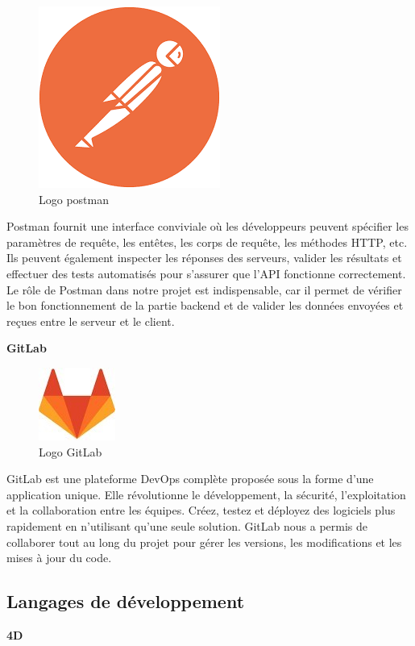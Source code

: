 \begin{figure}[htbp]
   \centering
   \includegraphics[scale=0.4]{Images/postman.png} 
   \caption{Logo postman\cite{Postman}}
   \label{fig:postman}
\end{figure}

Postman fournit une interface conviviale où les développeurs 
peuvent spécifier les paramètres de requête, les entêtes, 
les corps de requête, les méthodes HTTP, etc. Ils peuvent 
également inspecter les réponses des serveurs, valider les 
résultats et effectuer des tests automatisés pour s’assurer que 
l’API fonctionne correctement\cite{Postman}. Le rôle de Postman 
dans notre projet est indispensable, car il permet de vérifier 
le bon fonctionnement de la partie backend et de valider les 
données envoyées et reçues entre le serveur et le client.
\newline

\large 
\textbf{GitLab}

\begin{figure}[htbp]
   \centering
   \includegraphics[scale=0.6]{Images/gitlab.jpg} 
   \caption{Logo GitLab\cite{gitlab}}
   \label{fig:gitlab}
\end{figure}
GitLab est une plateforme DevOps complète proposée sous la forme 
d’une application unique. Elle révolutionne le développement, 
la sécurité, l’exploitation et la collaboration entre les équipes. 
Créez, testez et déployez des logiciels plus rapidement en 
n’utilisant qu’une seule solution. GitLab nous a permis de collaborer tout au long du projet pour gérer les versions, les modifications et les mises à jour du code.
\subsection{Langages de développement}
\large 
\textbf{4D}

